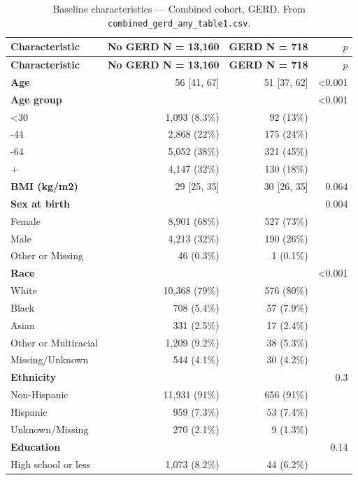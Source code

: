 \documentclass[11pt]{article}
\newcommand{\code}[1]{\texttt{\small #1}}
\begin{document}
\footnotesize\begin{longtable}{@{}p{6.4cm}rrr@{}}
\caption{Baseline characteristics --- Combined cohort, GERD. From \code{combined\_gerd\_any\_table1.csv}.}\label{tab:appM-t1-combined-gerd-any}\\
\toprule \textbf{Characteristic} & \textbf{No GERD     N = 13,160} & \textbf{GERD     N = 718} & \textbf{$p$} \\ \midrule \endfirsthead
\toprule \textbf{Characteristic} & \textbf{No GERD     N = 13,160} & \textbf{GERD     N = 718} & \textbf{$p$} \\ \midrule \endhead
\textbf{Age} & 56 [41, 67] & 51 [37, 62] & <0.001 \\
\textbf{Age group} &  &  & <0.001 \\
\quad <30 & 1,093 (8.3\%) & 92 (13\%) &  \\
\quad 30-44 & 2,868 (22\%) & 175 (24\%) &  \\
\quad 45-64 & 5,052 (38\%) & 321 (45\%) &  \\
\quad 65+ & 4,147 (32\%) & 130 (18\%) &  \\
\textbf{BMI (kg/m2)} & 29 [25, 35] & 30 [26, 35] & 0.064 \\
\textbf{Sex at birth} &  &  & 0.004 \\
\quad Female & 8,901 (68\%) & 527 (73\%) &  \\
\quad Male & 4,213 (32\%) & 190 (26\%) &  \\
\quad Other or Missing & 46 (0.3\%) & 1 (0.1\%) &  \\
\textbf{Race} &  &  & <0.001 \\
\quad White & 10,368 (79\%) & 576 (80\%) &  \\
\quad Black & 708 (5.4\%) & 57 (7.9\%) &  \\
\quad Asian & 331 (2.5\%) & 17 (2.4\%) &  \\
\quad Other or Multiracial & 1,209 (9.2\%) & 38 (5.3\%) &  \\
\quad Missing/Unknown & 544 (4.1\%) & 30 (4.2\%) &  \\
\textbf{Ethnicity} &  &  & 0.3 \\
\quad Non-Hispanic & 11,931 (91\%) & 656 (91\%) &  \\
\quad Hispanic & 959 (7.3\%) & 53 (7.4\%) &  \\
\quad Unknown/Missing & 270 (2.1\%) & 9 (1.3\%) &  \\
\textbf{Education} &  &  & 0.14 \\
\quad High school or less & 1,073 (8.2\%) & 44 (6.2\%) &  \\

\end{longtable}
\end{document}
